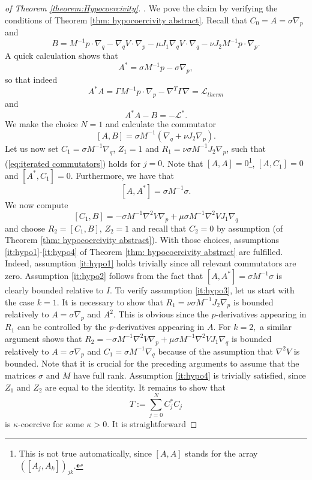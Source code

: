 \begin{proof}
	[of Theorem \ref{theorem:Hypocoercivity}]. We pove the claim by verifying
	the conditions of Theorem \ref{thm: hypocoercivity abstract}. Recall
	that $C_{0}=A=\sigma\nabla_{p}$ and 
	\[
	B=M^{-1}p\cdot\nabla_{q}-\nabla_{q}V\cdot\nabla_{p}-\mu J_{1}\nabla_{q}V\cdot\nabla_{q}-\nu J_{2}M^{-1}p\cdot\nabla_{p}.
	\]
	A quick calculation shows that 
	\[
	A^{*}=\sigma M^{-1}p-\sigma\nabla_{p},
	\]
	so that indeed 
	\[
	A^{*}A=\Gamma M^{-1}p\cdot\nabla_{p}-\nabla^{T}\Gamma\nabla=\mathcal{L}_{therm}
	\]
	and 
	\[
	A^{*}A-B=-\mathcal{L}^{*}.
	\]
	We make the choice $N=1$ and calculate the commutator 
	\[
	[A,B]=\sigma M^{-1}(\nabla_{q}+\nu J_{2}\nabla_{p}).
	\]
	Let us now set $C_{1}=\sigma M^{-1}\nabla_{q}$, $Z_{1}=1$ and $R_{1}=\nu\sigma M^{-1}J_{2}\nabla_{p}$,
	such that (\ref{eq:iterated commutators}) holds for $j=0$. Note
	that $[A,A]=0$\footnote{This is not true automatically, since $[A,A]$ stands for the array
		$([A_{j},A_{k}])_{jk}$.}, $[A,C_{1}]=0$ and $[A^{*},C_{1}]=0$. Furthermore, we have that
	\[
	[A,A^{*}]=\sigma M^{-1}\sigma.
	\]
	We now compute 
	\[
	[C_{1},B]=-\sigma M^{-1}\nabla^{2}V\nabla_{p}+\mu\sigma M^{-1}\nabla^{2}VJ_{1}\nabla_{q}
	\]
	and choose $R_{2}=[C_{1},B]$, $Z_{2}=1$ and recall that $C_{2}=0$
	by assumption (of Theorem \ref{thm: hypocoercivity abstract}). With those choices, assumptions \ref{it:hypo1}-\ref{it:hypo4} of Theorem \ref{thm: hypocoercivity abstract} are fulfilled. Indeed, assumption \ref{it:hypo1} holds trivially 
	since all relevant commutators are zero. Assumption \ref{it:hypo2} follows from the fact that $[A,A^{*}]=\sigma M^{-1}\sigma$ is clearly bounded
	relative to $I$. To verify assumption \ref{it:hypo3}, let us start with the
	case $k=1$. It is necessary to show that $R_{1}=\nu\sigma M^{-1}J_{2}\nabla_{p}$
	is bounded relatively to $A=\sigma\nabla_{p}$ and $A^{2}$.
	This is obvious since the $p$-derivatives appearing in $R_{1}$ can
	be controlled by the $p$-derivatives appearing in $A$. For $k=2,$
	a similar argument shows that $R_{2}=-\sigma M^{-1}\nabla^{2}V\nabla_{p}+\mu\sigma M^{-1}\nabla^{2}VJ_{1}\nabla_{q}$
	is bounded relatively to $A=\sigma\nabla_{p}$ and $C_{1}=\sigma M^{-1}\nabla_{q}$
	because of the assumption that $\nabla^{2}V$ is bounded. Note that it
	is crucial for the preceding arguments to assume that the matrices
	$\sigma$ and $M$ have full rank. Assumption \ref{it:hypo4} is trivially satisfied,
	since $Z_{1}$ and $Z_{2}$ are equal to the identity.  It remains to show that 
	\[
	T:=\sum_{j=0}^{N}C_{j}^{*}C_{j}
	\]
	is $\kappa$-coercive for some $\kappa>0$.  It is straightforward

\end{proof}
